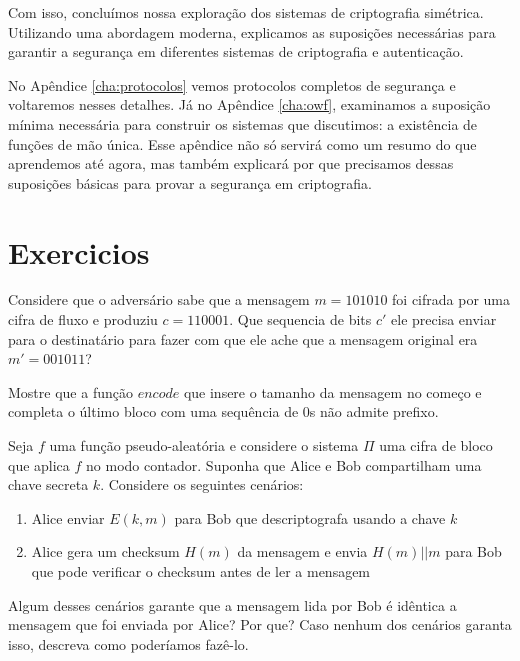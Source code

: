 Com isso, concluímos nossa exploração dos sistemas de criptografia simétrica.
Utilizando uma abordagem moderna, explicamos as suposições necessárias para garantir a segurança em diferentes sistemas de criptografia e autenticação.

No Apêndice \ref{cha:protocolos} vemos protocolos completos de segurança e voltaremos nesses detalhes.
Já no Apêndice \ref{cha:owf}, examinamos a suposição mínima necessária para construir os sistemas que discutimos: a existência de funções de mão única.
Esse apêndice não só servirá como um resumo do que aprendemos até agora, mas também explicará por que precisamos dessas suposições básicas para provar a segurança em criptografia.

\section{Exercicios}
\label{sec:exercicios}


\begin{exercicio}
  Considere que o adversário sabe que a mensagem $m = 101010$ foi cifrada por uma cifra de fluxo e produziu $c = 110001$.
  Que sequencia de bits $c'$ ele precisa enviar para o destinatário para fazer com que ele ache que a mensagem original era $m' = 001011$?
\end{exercicio}


\begin{exercicio}
  Mostre que a função $encode$ que insere o tamanho da mensagem no começo e completa o último bloco com uma sequência de $0$s não admite prefixo.
\end{exercicio}

\begin{exercicio}
  Seja $f$ uma função pseudo-aleatória e considere o sistema $\Pi$ uma cifra de bloco que aplica $f$ no modo contador.
  Suponha que Alice e Bob compartilham uma chave secreta $k$.
  Considere os seguintes cenários:
  \begin{enumerate}
  \item Alice enviar $E(k, m)$ para Bob que descriptografa usando a chave $k$
  \item Alice gera um checksum $H(m)$ da mensagem e envia $H(m)||m$ para Bob que pode verificar o checksum antes de ler a mensagem
  \end{enumerate}
  Algum desses cenários garante que a mensagem lida por Bob é idêntica a mensagem que foi enviada por Alice? Por que? Caso nenhum dos cenários garanta isso, descreva como poderíamos fazê-lo.
\end{exercicio}
